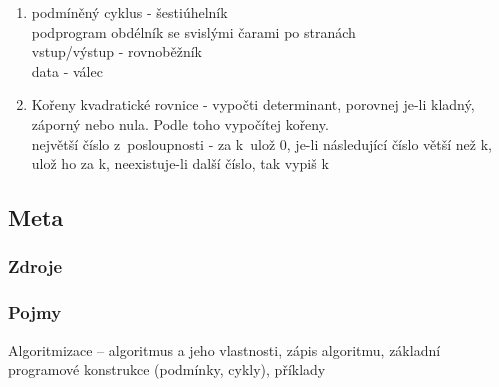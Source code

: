 \documentclass[12pt]{article}
\begin{document}
\begin{enumerate}
\item podmíněný cyklus - šestiúhelník\\
podprogram obdélník se svislými čarami po stranách\\
vstup/výstup - rovnoběžník\\
data - válec
\item Kořeny kvadratické rovnice - vypočti determinant, porovnej je-li kladný, záporný nebo nula. Podle toho vypočítej kořeny.\\
největší číslo z~posloupnosti - za k~ulož 0, je-li následující číslo větší než k, ulož ho za k, neexistuje-li další číslo, tak vypiš
k~\end{enumerate}
\subsection{Meta}
\subsubsection{Zdroje}
\subsubsection{Pojmy}
Algoritmizace – algoritmus a jeho vlastnosti, zápis algoritmu, základní programové konstrukce (podmínky, cykly), příklady
\end{document}
